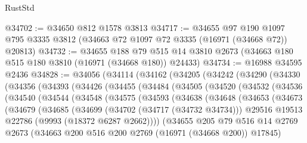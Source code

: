 \begin{lexlean}{RustStd}
\begin{coremodule}
@34702 := @34650 @812 @1578 @3813
@34717 := @34655
    @97
    @190
    @1097
    @795
    @3335
    @3812
    (@34663 @72 @1097 @72 @3335 (@16971 (@34668 @72)) @20813)
@34732 := @34655
    @188
    @79
    @515
    @14
    @3810
    @2673
    (@34663 @180 @515 @180 @3810 (@16971 (@34668 @180)) @24433)
@34734 := @16988 @34595 @2436
@34828 := @34056
    (@34114
      (@34162
        (@34205
          (@34242
            (@34290
              (@34330
                (@34356
                  (@34393
                    (@34426
                      (@34455
                        (@34484
                          (@34505
                            (@34520
                              (@34532
                                (@34536
                                  (@34540
                                    (@34544
                                      (@34548
                                        (@34575
                                          (@34593
                                            (@34638
                                              (@34648
                                                (@34653
                                                  (@34673
                                                    (@34679
                                                      (@34685
                                                        (@34699
                                                          (@34702 (@34717 (@34732 @34734)))
                                                          @29516
                                                          @19513
                                                          @22786
                                                          (@9993 (@18372 @6287 @2662))))
                                                      (@34655
                                                        @205
                                                        @79
                                                        @516
                                                        @14
                                                        @2769
                                                        @2673
                                                        (@34663
                                                          @200
                                                          @516
                                                          @200
                                                          @2769
                                                          (@16971 (@34668 @200))
                                                          @17845)

\end{coremodule}
\end{lexlean}
